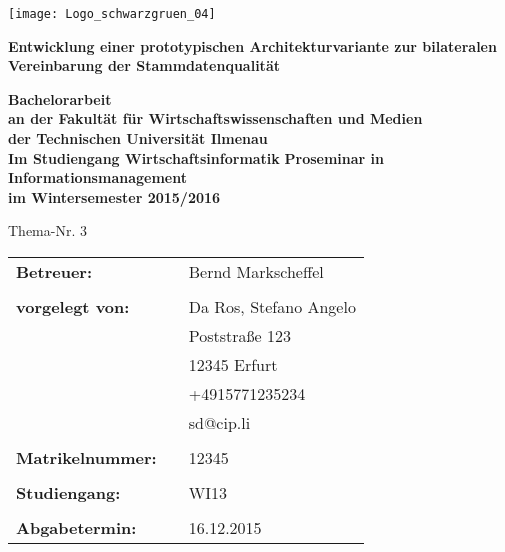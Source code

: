 \documentclass[float=false, crop=false]{standalone}
\begin{document}
\begin{titlepage}
\begin{minipage}{1\textwidth}
\flushright 
   \texttt{[image: Logo\_schwarzgruen\_04]}
\end{minipage}

\vspace{3cm}
\begin{center}
\textbf{\LARGE{Entwicklung einer prototypischen Architekturvariante zur bilateralen Vereinbarung der Stammdatenqualität}}
\end{center}
\vspace{1.5cm}

\begin{center}
\textbf{\LARGE{Bachelorarbeit}}
\\
\textbf{\LARGE{an der Fakultät für Wirtschaftswissenschaften und Medien}}
\\
\textbf{\LARGE{der Technischen Universität Ilmenau}}
\\
\textbf{\LARGE{Im Studiengang Wirtschaftsinformatik}}
\textbf{Proseminar in Informationsmanagement\\ im Wintersemester 2015/2016}
\end{center}

\vspace{0.5cm}
\begin{center}
	Thema-Nr. 3
\end{center}

\vspace{2cm}

\begin{flushleft}
\begin{tabular}{lll}
\textbf{Betreuer:} & &  Bernd Markscheffel\\
& & \\
\textbf{vorgelegt von:}& & Da Ros, Stefano Angelo\\
& & Poststraße 123\\
& & 12345 Erfurt\\
& & +4915771235234\\
& & sd@cip.li\\
& & \\
\textbf{Matrikelnummer:} & & 12345\\
& & \\

\textbf{Studiengang:} & & WI13\\
& & \\

\textbf{Abgabetermin:} & & 16.12.2015
\end{tabular}
\end{flushleft}
\end{titlepage}
\end{document}
